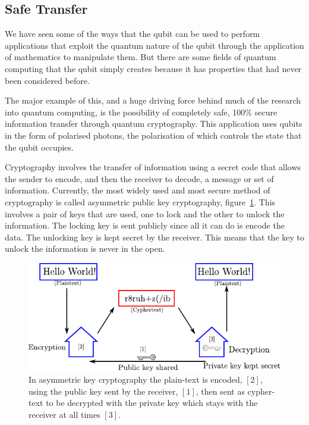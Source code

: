 \subsection{Safe Transfer}
\label{sec:safe_transfer}
We have seen some of the ways that the qubit can be used to perform applications that exploit the quantum nature of the qubit through the application of mathematics to manipulate them. But there are some fields of quantum computing that the qubit simply creates because it has properties that had never been considered before.

The major example of this, and a huge driving force behind much of the research into quantum computing, is the possibility of completely safe, 100\% secure information transfer through quantum cryptography. This application uses qubits in the form of polarised photons, the polarisation of which controls the state that the qubit occupies.

Cryptography involves the transfer of information using a secret code that allows the sender to encode, and then the receiver to decode, a message or set of information. Currently, the most widely used and most secure method of cryptography is called asymmetric public key cryptography, figure~\ref{fig:asymmetric-key}. This involves a pair of keys that are used, one to lock and the other to unlock the information. The locking key is sent publicly since all it can do is encode the data. The unlocking key is kept secret by the receiver. This means that the key to unlock the information is never in the open.
\begin{figure}[ht]
	\centering
	\includegraphics{asymmetrickey.pdf}
	\caption{In asymmetric key cryptography the plain-text is encoded, $[2]$, using the public key sent by the receiver, $[1]$, then sent as cypher-text to be decrypted with the private key which stays with the receiver at all times $[3]$.\label{fig:asymmetric-key}}
\end{figure}


